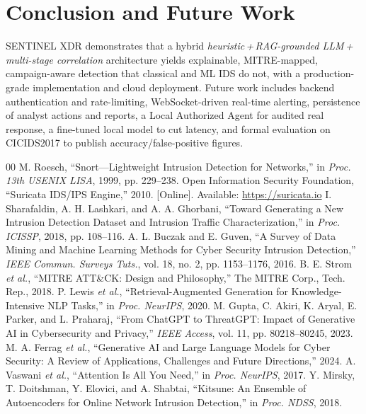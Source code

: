\documentclass[conference]{IEEEtran}
\begin{document}
\section{Conclusion and Future Work}
SENTINEL XDR demonstrates that a hybrid \emph{heuristic\,+\,RAG-grounded LLM\,+\,multi-stage correlation} architecture yields explainable, MITRE-mapped, campaign-aware detection that classical and ML IDS do not, with a production-grade implementation and cloud deployment. Future work includes backend authentication and rate-limiting, WebSocket-driven real-time alerting, persistence of analyst actions and reports, a Local Authorized Agent for audited real response, a fine-tuned local model to cut latency, and formal evaluation on CICIDS2017 to publish accuracy/false-positive figures.

\begin{thebibliography}{00}
 M. Roesch, ``Snort---Lightweight Intrusion Detection for Networks,'' in \emph{Proc. 13th USENIX LISA}, 1999, pp. 229--238.
 Open Information Security Foundation, ``Suricata IDS/IPS Engine,'' 2010. [Online]. Available: \url{https://suricata.io}
 I. Sharafaldin, A. H. Lashkari, and A. A. Ghorbani, ``Toward Generating a New Intrusion Detection Dataset and Intrusion Traffic Characterization,'' in \emph{Proc. ICISSP}, 2018, pp. 108--116.
 A. L. Buczak and E. Guven, ``A Survey of Data Mining and Machine Learning Methods for Cyber Security Intrusion Detection,'' \emph{IEEE Commun. Surveys Tuts.}, vol. 18, no. 2, pp. 1153--1176, 2016.
 B. E. Strom \emph{et al.}, ``MITRE ATT\&CK: Design and Philosophy,'' The MITRE Corp., Tech. Rep., 2018.
 P. Lewis \emph{et al.}, ``Retrieval-Augmented Generation for Knowledge-Intensive NLP Tasks,'' in \emph{Proc. NeurIPS}, 2020.
 M. Gupta, C. Akiri, K. Aryal, E. Parker, and L. Praharaj, ``From ChatGPT to ThreatGPT: Impact of Generative AI in Cybersecurity and Privacy,'' \emph{IEEE Access}, vol. 11, pp. 80218--80245, 2023.
 M. A. Ferrag \emph{et al.}, ``Generative AI and Large Language Models for Cyber Security: A Review of Applications, Challenges and Future Directions,'' 2024.
 A. Vaswani \emph{et al.}, ``Attention Is All You Need,'' in \emph{Proc. NeurIPS}, 2017.
 Y. Mirsky, T. Doitshman, Y. Elovici, and A. Shabtai, ``Kitsune: An Ensemble of Autoencoders for Online Network Intrusion Detection,'' in \emph{Proc. NDSS}, 2018.
\end{thebibliography}
\end{document}
